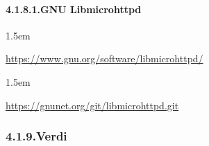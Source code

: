 \documentclass[12pt,twoside]{article}
\begin{document}
\paragraph{4.1.8.1.\hspace*{0.5em}GNU Libmicrohttpd}%

\begin{mddefinitions}%


\begin{mdbmarginx}{}{}{}{1.5em}%
\begin{mddefdata}%
\href{https://www.gnu.org/software/libmicrohttpd/}{{\ttfamily https://\hspace{0pt}www.\hspace{0pt}gnu.\hspace{0pt}org/\hspace{0pt}software/\hspace{0pt}libmicrohttpd/\hspace{0pt}}}
\end{mddefdata}%
\end{mdbmarginx}%


\begin{mdbmarginx}{}{}{}{1.5em}%
\begin{mddefdata}%
\href{https://gnunet.org/git/libmicrohttpd.git}{{\ttfamily https://\hspace{0pt}gnunet.\hspace{0pt}org/\hspace{0pt}git/\hspace{0pt}libmicrohttpd.\hspace{0pt}git}}%
\end{mddefdata}%
\end{mdbmarginx}%
\end{mddefinitions}%

\subsubsection{4.1.9.\hspace*{0.5em}Verdi}%
\end{document}
